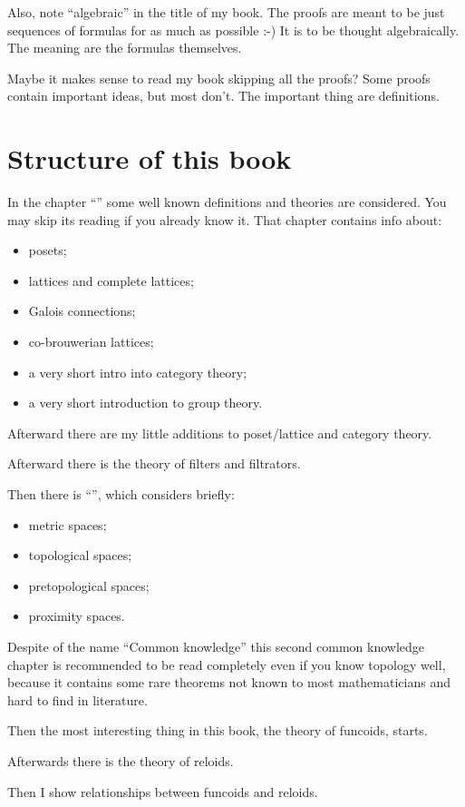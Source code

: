 Also, note ``algebraic'' in the title of my book. The proofs are meant to be just sequences of formulas for as much as possible :-) It is to be thought algebraically. The meaning are the formulas themselves.

Maybe it makes sense to read my book skipping all the proofs? Some proofs contain important ideas, but most don't. The important thing are definitions.

\section{Structure of this book}

In the chapter ``'' some well known definitions
and theories are considered. You may skip its reading if you already
know it. That chapter contains info about:
\begin{itemize}
\item posets;
\item lattices and complete lattices;
\item Galois connections;
\item co-brouwerian lattices;
\item a very short intro into category theory;
\item a very short introduction to group theory.
\end{itemize}
Afterward there are my little additions to poset/lattice and category
theory.

Afterward there is the theory of filters and filtrators.

Then there is ``'', which considers briefly:
\begin{itemize}
\item metric spaces;
\item topological spaces;
\item pretopological spaces;
\item proximity spaces.
\end{itemize}
Despite of the name ``Common knowledge'' this second common knowledge
chapter is recommended to be read completely even if you know topology
well, because it contains some rare theorems not known to most mathematicians
and hard to find in literature.

Then the most interesting thing in this book, the theory of funcoids,
starts.

Afterwards there is the theory of reloids.

Then I show relationships between funcoids and reloids.

